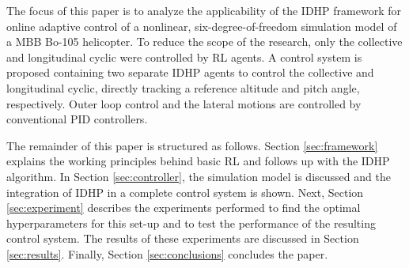 The focus of this paper is to analyze the applicability of the IDHP framework for online adaptive control of a nonlinear, six-degree-of-freedom simulation model of a MBB Bo-105 helicopter. To reduce the scope of the research, only the collective and longitudinal cyclic were controlled by RL agents. A control system is proposed containing two separate IDHP agents to control the collective and longitudinal cyclic, directly tracking a reference altitude and pitch angle, respectively. Outer loop control and the lateral motions are controlled by conventional PID controllers. 

The remainder of this paper is structured as follows. Section \ref{sec:framework} explains the working principles behind basic RL and follows up with the IDHP algorithm. In Section \ref{sec:controller}, the simulation model is discussed and the integration of IDHP in a complete control system is shown. Next, Section \ref{sec:experiment} describes the experiments performed to find the optimal hyperparameters for this set-up and to test the performance of the resulting control system. The results of these experiments are discussed in Section \ref{sec:results}. Finally, Section \ref{sec:conclusions} concludes the paper. 